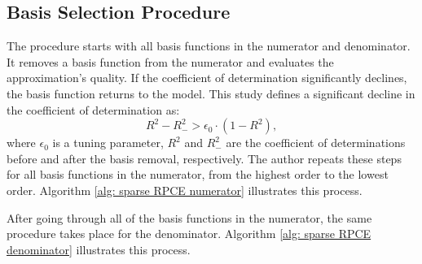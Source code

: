 %
%

\subsection{Basis Selection Procedure}
\label{ssec: selection procedure}

The procedure starts with all basis functions in the numerator and denominator.
It removes a basis function from the numerator and evaluates the approximation's quality.
If the coefficient of determination significantly declines, the basis function returns to the model.
{This study defines a significant decline in the coefficient of determination as:}%
\begin{equation}
    R^{2} - R_{-}^{2} > \epsilon_{0} \cdot \left(1-R^{2}\right),
    \label{decline criteria}
\end{equation}
where $\epsilon_{0}$ is a tuning parameter, $R^{2}$ and $R_{-}^{2}$ are the coefficient of determinations before and after the basis removal, respectively.
The author repeats these steps for all basis functions in the numerator, from the highest order to the lowest order.
Algorithm \ref{alg: sparse RPCE numerator} illustrates this process.



After going through all of the basis functions in the numerator, the same procedure takes place for the denominator.
Algorithm \ref{alg: sparse RPCE denominator} illustrates this process.

